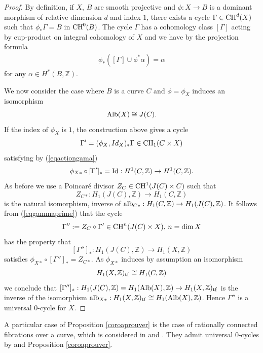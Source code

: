 \documentclass[10pt]{article}
\begin{document}
\begin{proof} By definition, if $X,\,B$ are smooth projective and $\phi: X\rightarrow B$ is a dominant  morphism of relative dimension $d$ and  index $1$, there exists a cycle $\Gamma\in {\rm CH}^d(X)$ such that $\phi_{*}\Gamma=B$ in ${\rm CH}^0(B)$. The cycle  $\Gamma$  has a cohomology class $[\Gamma]$ acting by cup-product on integral cohomology of $X$ and we have by the projection formula
\begin{eqnarray}\label{eqactiongama} \phi_* ([\Gamma]\cup \phi^*\alpha)=\alpha\end{eqnarray}
for any $\alpha\in H^*(B,\mathbb{Z})$.

We now consider the case where $B$ is a curve $C$ and $\phi=\phi_X$ induces an isomorphism
$${\rm Alb}(X)\cong J(C).$$
 If  the index of $\phi_X$ is $1$, the construction above gives a cycle
$$\Gamma'= (\phi_X,Id_X)_*\Gamma\in {\rm CH}_1(C\times X)$$
satisfying  by (\ref{eqactiongama})
\begin{eqnarray}\label{eqgammaprime} \phi_{X*}\circ [\Gamma']_*={\rm Id}: H^1(C,\mathbb{Z})\rightarrow H^1(C,\mathbb{Z}).
\end{eqnarray}
As before we use a Poincar\'{e} divisor $Z_C\in {\rm CH}^1(J(C)\times C)$ such that
$$Z_{C*}: H_1(J(C),\mathbb{Z})\rightarrow H_1(C,\mathbb{Z})$$
is the natural isomorphism, inverse of ${\rm alb}_{C*}:  H_1(C,\mathbb{Z})\rightarrow H_1(J(C),\mathbb{Z})$.
It follows from (\ref{eqgammaprime}) that
the cycle
$$\Gamma'':=Z_{C}\circ \Gamma' \in{\rm CH}^n(J(C)\times X),\, n={\rm dim}\,X$$
has the property that
$$[\Gamma'']_*: H_1(J(C),\mathbb{Z})\rightarrow H_1(X,\mathbb{Z})$$
satisfies $\phi_{X*}\circ [\Gamma'']_*=Z_{C*}$. As $\phi_{X*}$ induces by assumption an isomorphism
$$H_1(X,\mathbb{Z})_{\rm tf}\cong H_1(C,\mathbb{Z})$$
we conclude that $[\Gamma'']_*: H_1(J(C),\mathbb{Z})=H_1({\rm Alb}(X),\mathbb{Z})\rightarrow H_1(X,\mathbb{Z})_{\rm tf}$ is the inverse of the isomorphism ${\rm alb}_{X*}: H_1(X,\mathbb{Z})_{\rm tf}\cong H_1({\rm Alb}(X),\mathbb{Z})$. Hence $\Gamma''$ is a universal $0$-cycle for $X$.
\end{proof}
A particular case of Proposition \ref{coroaprouver} is the case of rationally connected fibrations over a curve, which is considered in \cite{colliotTh} and \cite{voisinArbarello}. They admit universal $0$-cycles by \cite{ghs} and Proposition \ref{coroaprouver}.
\end{document}
